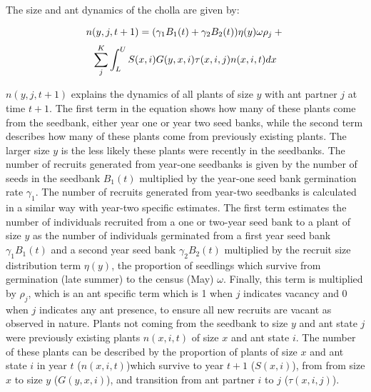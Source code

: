 \documentclass[11pt]{article}
\begin{document}
The size and ant dynamics of the cholla are given by:
		
	\begin{linenomath*}
		$$
		n(y,j,t+1) = (\gamma_1 B_1(t) + \gamma_2 B_2(t)) \eta(y) \omega \rho_j  + \\
		$$
		$$
		\sum_{j}^{K} \int_L^U S(x,i) G(y,x,i) \tau(x,i,j) n(x,i,t) dx \\
		$$
	\end{linenomath*}
	
$n(y,j,t+1)$  explains the dynamics of all plants of size $y$ with ant partner $j$ at time $t+1$. 
The first term in the equation shows how many of these plants come from the seedbank, either year one or year two seed banks, while the second term describes how many of these plants come from previously existing plants. 
The larger size $y$ is the less likely these plants were recently in the seedbanks. 
The number of recruits generated from year-one seedbanks is given by the number of seeds in the seedbank $B_1(t)$ multiplied by the year-one seed bank germination rate $\gamma_1$.
The number of recruits generated from year-two seedbanks is calculated in a similar way with year-two specific estimates. 
The first term estimates the number of individuals recruited from a one or two-year seed bank to a plant of size $y$ as the number of individuals germinated from a first year seed bank $\gamma_1 B_1(t)$ and a second year seed bank $\gamma_2 B_2(t)$ multiplied by the recruit size distribution term $\eta(y)$, the proportion of seedlings which survive from germination (late summer) to the census (May) $\omega$.
Finally, this term is multiplied by $\rho_j$, which is an ant specific term which is 1 when $j$ indicates vacancy and 0 when $j$ indicates any ant presence, to ensure all new recruits are vacant as observed in nature. 
Plants not coming from the seedbank to size $y$ and ant state $j$ were previously existing plants $n(x,i,t)$ of size $x$ and ant state $i$.
The number of these plants can be described by the proportion of plants of size $x$ and ant state $i$ in year $t$ ($n(x,i,t)$)which survive to year $t+1$ ($S(x,i)$), from from size $x$ to size $y$ ($G(y,x,i)$), and transition from ant partner $i$ to $j$ ($\tau(x,i,j)$).
\end{document}
